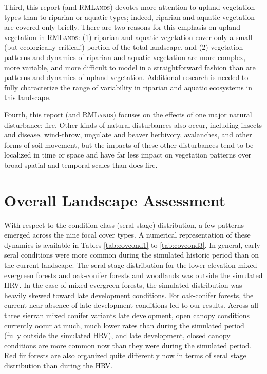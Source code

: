 Third, this report (and \textsc{RMLands}) devotes more attention to upland vegetation types than to riparian or aquatic types; indeed, riparian and aquatic vegetation are covered only briefly. There are two reasons for this emphasis on upland vegetation in \textsc{RMLands}: (1) riparian and aquatic vegetation cover only a small (but ecologically critical!) portion of the total landscape, and (2) vegetation patterns and dynamics of riparian and aquatic vegetation are more complex, more variable, and more difficult to model in a straightforward fashion than are patterns and dynamics of upland vegetation. Additional research is needed to fully characterize the range of variability in riparian and aquatic ecosystems in this landscape. 

Fourth, this report (and \textsc{RMLands}) focuses on the effects of one major natural disturbance: fire. Other kinds of natural disturbances also occur, including insects and disease, wind-throw, ungulate and beaver herbivory, avalanches, and other forms of soil movement, but the impacts of these other disturbances tend to be localized in time or space and have far less impact on vegetation patterns over broad spatial and temporal scales than does fire.


\clearpage
\section{Overall Landscape Assessment}

With respect to the condition class (seral stage) distribution, a few patterns emerged across the nine focal cover types. A numerical representation of these dynamics is available in Tables \ref{tab:covcond1} to \ref{tab:covcond3}. In general, early seral conditions were more common during the simulated historic period than on the current landscape. The seral stage distribution for the lower elevation mixed evergreen forests and oak-conifer forests and woodlands was outside the simulated HRV. In the case of mixed evergreen forests, the simulated distribution was heavily skewed toward late development conditions. For oak-conifer forests, the current near-absence of late development conditions led to our results. Across all three sierran mixed conifer variants late development, open canopy conditions currently occur at much, much lower rates than during the simulated period (fully outside the simulated HRV), and late development, closed canopy conditions are more common now than they were during the simulated period. Red fir forests are also organized quite differently now in terms of seral stage distribution than during the HRV.

